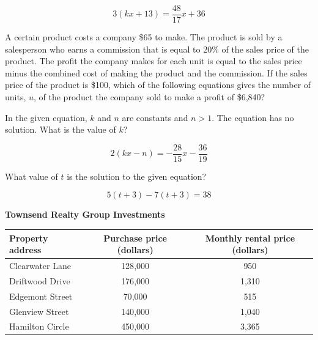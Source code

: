 \[
3(kx + 13) = \frac{48}{17}x + 36
\]





\newpage
\noindent\markforreview

\vspace{1em}

A certain product costs a company \$65 to make. The product is sold by a salesperson who earns a commission that is equal to 20\% of the sales price of the product. The profit the company makes for each unit is equal to the sales price minus the combined cost of making the product and the commission. If the sales price of the product is \$100, which of the following equations gives the number of units, \( u \), of the product the company sold to make a profit of \$6{,}840?

\vspace{0.75em}


\vspace{2em}

\noindent\markforreview

\vspace{1em}

In the given equation, \( k \) and \( n \) are constants and \( n > 1 \). The equation has no solution. What is the value of \( k \)?

\[
2(kx - n) = -\frac{28}{15}x - \frac{36}{19}
\]





\newpage
\noindent\markforreview

\vspace{1em}

What value of \( t \) is the solution to the given equation?

\[
5(t + 3) - 7(t + 3) = 38
\]


\vspace{2em}

\noindent\markforreview

\vspace{1em}

\begin{center}
\textbf{Townsend Realty Group Investments}

\vspace{0.75em}
\renewcommand{\arraystretch}{1.3}
\begin{tabular}{|l|c|c|}
\hline
\textbf{Property address} & \textbf{Purchase price (dollars)} & \textbf{Monthly rental price (dollars)} \\
\hline
Clearwater Lane & 128{,}000 & 950 \\
Driftwood Drive & 176{,}000 & 1{,}310 \\
Edgemont Street & 70{,}000 & 515 \\
Glenview Street & 140{,}000 & 1{,}040 \\
Hamilton Circle & 450{,}000 & 3{,}365 \\
\hline
\end{tabular}
\end{center}

